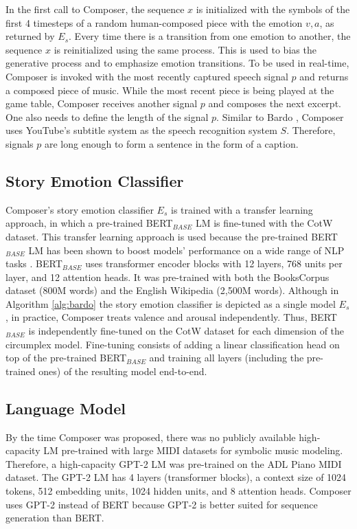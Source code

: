 In the first call to Composer, the sequence $x$ is initialized with the symbols of the first 4 timesteps of a random human-composed piece with the emotion $v, a$, as returned by $E_s$. Every time there is a transition from one emotion to another, the sequence $x$ is reinitialized using the same process. This is used to bias the generative process and to emphasize emotion transitions. To be used in real-time, Composer is invoked with the most recently captured speech signal $p$ and returns a composed piece of music. While the most recent piece is being played at the game table, Composer receives another signal $p$ and composes the next excerpt. One also needs to define the length of the signal $p$. Similar to Bardo \cite{padovani2017}, Composer uses YouTube's subtitle system as the speech recognition system $S$. Therefore, signals $p$ are long enough to form a sentence in the form of a caption.

\subsection{Story Emotion Classifier}

Composer's story emotion classifier $E_s$ is trained with a transfer learning approach, in which a pre-trained BERT$_{BASE}$ LM \cite{devlin2018bert} is fine-tuned with the CotW dataset. This transfer learning approach is used because the pre-trained BERT$_{BASE}$ LM has been shown to boost models' performance on a wide range of NLP tasks \cite{devlin2018bert}. BERT$_{BASE}$ uses transformer encoder blocks with 12 layers, 768 units per layer, and 12 attention heads. It was pre-trained with both the BooksCorpus dataset (800M words) \cite{zhu2015aligning} and the English Wikipedia (2,500M words). Although in Algorithm \ref{alg:bardo} the story emotion classifier is depicted as a single model $E_s$, in practice, Composer treats valence and arousal independently. Thus, BERT$_{BASE}$ is independently fine-tuned on the CotW dataset \cite{padovani2017} for each dimension of the circumplex model. Fine-tuning consists of adding a linear classification head on top of the pre-trained BERT$_{BASE}$ and training all layers (including the pre-trained ones) of the resulting model end-to-end.

\subsection{Language Model}

By the time Composer was proposed, there was no publicly available high-capacity LM pre-trained with large MIDI datasets for symbolic music modeling. Therefore, a high-capacity GPT-2 LM was pre-trained on the ADL Piano MIDI dataset. The GPT-2 LM has 4 layers (transformer blocks), a context size of 1024 tokens, 512 embedding units, 1024 hidden units, and 8 attention heads. Composer uses GPT-2 instead of BERT because GPT-2 is better suited for sequence generation than BERT.

